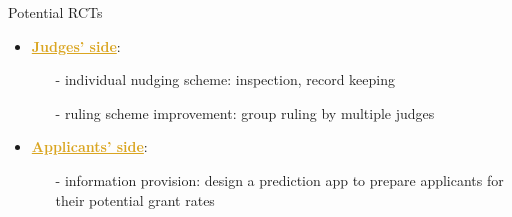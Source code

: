 \begin{frame}{Potential RCTs}
    \begin{itemize}
        \item<+-> \textcolor{goldenrod}{\textbf{\underline{Judges' side}}}:
        \begin{itemize}
            \item[-] individual nudging scheme: inspection, record keeping
            \item[-] ruling scheme improvement: group ruling by multiple judges
        \end{itemize}
        \item<+-> \textcolor{goldenrod}{\textbf{\underline{Applicants' side}}}:
        \begin{itemize}
            \item[-] information provision: design a prediction app to prepare applicants for their potential grant rates
        \end{itemize}
    \end{itemize}
\end{frame}